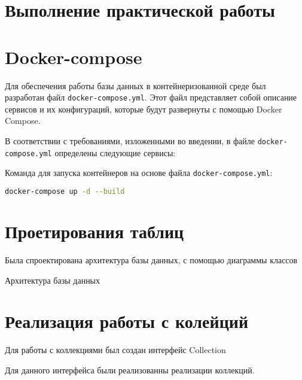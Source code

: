 \graphicspath{{img}} %
\section*{\LARGE Выполнение практической работы}

\section{Docker-compose}
Для обеспечения работы базы данных в контейнеризованной среде был разработан файл \texttt{docker-compose.yml}.
Этот файл представляет собой описание сервисов и их конфигураций,
которые будут развернуты с помощью Docker Compose.\par
В соответствии с требованиями, изложенными во введении,
в файле \texttt{docker-compose.yml} определены следующие сервисы:





Команда для запуска контейнеров на основе файла \texttt{docker-compose.yml}:

\begin{lstlisting}[language=bash]
docker-compose up -d --build
\end{lstlisting}


\section{Проетирования таблиц}
Была спроектирована архитектура базы данных, с помощью диаграммы классов

\begin{image}
    \caption{Архитектура базы данных}
    \label{fig:architec}
\end{image}

\section{Реализация работы с колейций}
Для работы с коллекциями был создан интерфейс Collection



Для данного интерфейса были реализованны реализации коллекций.






\clearpage

